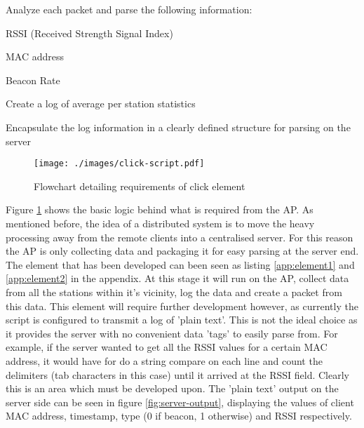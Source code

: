 \begin{itemize*}
 \item Analyze each packet and parse the following information:
  \begin{itemize*}
   \item RSSI (Received Strength Signal Index)
   \item MAC address
   \item Beacon Rate
  \end{itemize*}
 \item Create a log of average per station statistics
 \item Encapsulate the log information in a clearly defined structure for parsing on the server
\end{itemize*}

\begin{figure}[h]
 \centering
 \texttt{[image: ./images/click-script.pdf]}
 \caption{Flowchart detailing requirements of click element}
 \label{fig:click-flow-chart}
\end{figure}

Figure \ref{fig:click-flow-chart} shows the basic logic behind what is required from the AP. As mentioned before, the idea of a distributed system is to move the heavy processing away from the remote clients into a centralised server. For this reason the AP is only collecting data and packaging it for easy parsing at the server end. 
\label{sec:discuss-minimal-tx}
The element that has been developed can been seen as listing \ref{app:element1} and \ref{app:element2} in the appendix. At this stage it will run on the AP, collect data from all the stations within it's vicinity, log the data and create a packet from this data. This element will require further development however, as currently the script is configured to transmit a log of 'plain text'. This is not the ideal choice as it provides the server with no convenient data 'tags' to easily parse from. For example, if the server wanted to get all the RSSI values for a certain MAC address, it would have for do a string compare on each line and count the delimiters (tab characters in this case) until it arrived at the RSSI field. Clearly this is an area which must be developed upon. The 'plain text' output on the server side can be seen in figure \ref{fig:server-output}, displaying the values of client MAC address, timestamp, type (0 if beacon, 1 otherwise) and RSSI respectively.

